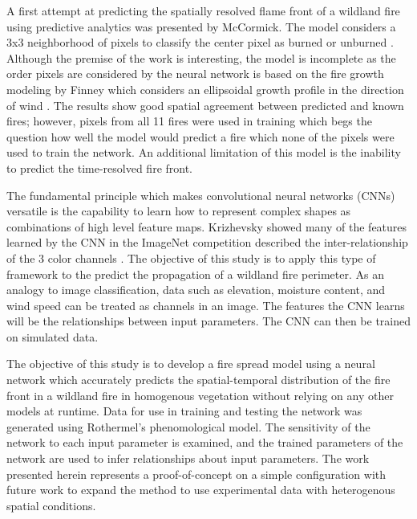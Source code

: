 \documentclass[twocolumn]{svjour3}          %
\newcommand{\etal}{\textit{et al}. }
\begin{document}
A first attempt at predicting the spatially resolved flame front of a
wildland fire using predictive analytics was presented by McCormick.
The model considers a 3x3 neighborhood of pixels to classify the center pixel as burned
or unburned \cite{mccormick2001toward,mccormick2002developing}.
Although the premise of the work is interesting, the model is incomplete
as the order pixels are considered by the neural network  is based on the
fire growth modeling by Finney which considers an ellipsoidal growth profile in the direction of wind
\cite{finney1999mechanistic}. The results show good spatial agreement between predicted and
known fires; however, pixels from all 11 fires were used in training which
begs the question how well the model would predict a fire which none of the
pixels were used to train the network.
An additional limitation of this model is the inability to predict the time-resolved
fire front.



The fundamental principle which makes convolutional neural networks (CNNs)
versatile is the capability to learn how to represent complex
shapes as combinations of high level feature maps. Krizhevsky showed
many of the features learned by the CNN in the ImageNet competition
described the inter-relationship of the 3 color channels \cite{krizhevsky2012imagenet}.
The objective of this study is to apply this type of framework to the
predict the propagation of a wildland fire perimeter. As an analogy to
image classification, data such as elevation, moisture content, and wind speed
can be treated as channels in an image. The features the CNN learns will
be the relationships between input parameters. The CNN can then be trained on
simulated data.

The objective of this study is to develop a fire spread model using a
neural network which accurately predicts the spatial-temporal distribution of the
fire front in a wildland fire in homogenous vegetation without relying
on any other models at runtime. Data for use in
training and testing the network was generated using Rothermel's phenomological
model. The sensitivity of the network to each input parameter is examined,
and the trained parameters of the network are used to infer relationships
about input parameters. The work presented herein represents a proof-of-concept
on a simple configuration with future work to expand the method to use
experimental data with heterogenous spatial conditions.
\end{document}

